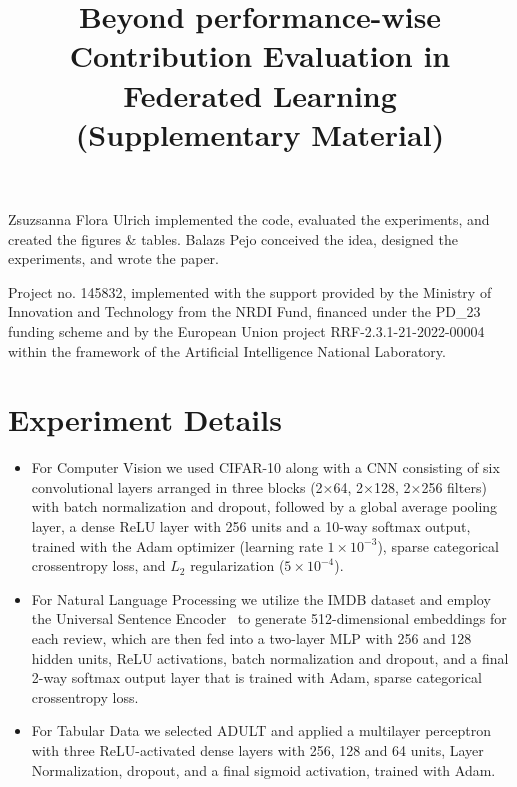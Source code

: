 \documentclass{uai2026}
\begin{document}
\begin{contributions}
    Zsuzsanna Flora Ulrich implemented the code, evaluated the experiments, and created the figures \& tables. Balazs Pejo conceived the idea, designed the experiments, and wrote the paper.
\end{contributions}

\begin{acknowledgements}
    Project no. 145832, implemented with the support provided by the Ministry of Innovation and Technology from the NRDI Fund, financed under the PD\_23 funding scheme and by the European Union project RRF-2.3.1-21-2022-00004 within the framework of the Artificial Intelligence National Laboratory.
\end{acknowledgements}

\newpage

\newpage

\onecolumn

\title{Beyond performance-wise Contribution Evaluation in Federated Learning\\(Supplementary Material)}
\maketitle

\appendix

\section{Experiment Details}
\label{app:setup}

\begin{itemize}
    \item For Computer Vision we used CIFAR-10 along with a CNN consisting of six convolutional layers arranged in three blocks (2×64, 2×128, 2×256 filters) with batch normalization and dropout, followed by a global average pooling layer, a dense ReLU layer with 256 units and a 10-way softmax output, trained with the Adam optimizer (learning rate $1\times10^{-3}$), sparse categorical crossentropy loss, and $L_2$ regularization ($5\times10^{-4}$).
    \item For Natural Language Processing we utilize the IMDB dataset and employ the Universal Sentence Encoder~\cite{use} to generate 512-dimensional embeddings for each review, which are then fed into a two-layer MLP with 256 and 128 hidden units, ReLU activations, batch normalization and dropout, and a final 2-way softmax output layer that is trained with Adam, sparse categorical crossentropy loss.
    \item For Tabular Data we selected ADULT and applied a multilayer perceptron with three ReLU-activated dense layers with 256, 128 and 64 units, Layer Normalization, dropout, and a final sigmoid activation, trained with Adam.
\end{itemize}
\end{document}
